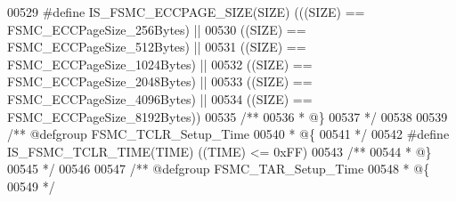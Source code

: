 \begin{DoxyCode}
00529 \textcolor{preprocessor}{#}\textcolor{preprocessor}{define} \textcolor{preprocessor}{IS\_FSMC\_ECCPAGE\_SIZE}\textcolor{preprocessor}{(}\textcolor{preprocessor}{SIZE}\textcolor{preprocessor}{)} \textcolor{preprocessor}{(}\textcolor{preprocessor}{(}\textcolor{preprocessor}{(}\textcolor{preprocessor}{SIZE}\textcolor{preprocessor}{)} \textcolor{preprocessor}{==} FSMC_ECCPageSize_256Bytes\textcolor{preprocessor}{)} \textcolor{preprocessor}{||}
00530                                     \textcolor{preprocessor}{(}\textcolor{preprocessor}{(}\textcolor{preprocessor}{SIZE}\textcolor{preprocessor}{)} \textcolor{preprocessor}{==} FSMC_ECCPageSize_512Bytes\textcolor{preprocessor}{)} \textcolor{preprocessor}{||}
00531                                     \textcolor{preprocessor}{(}\textcolor{preprocessor}{(}\textcolor{preprocessor}{SIZE}\textcolor{preprocessor}{)} \textcolor{preprocessor}{==} FSMC_ECCPageSize_1024Bytes\textcolor{preprocessor}{)} \textcolor{preprocessor}{||}
00532                                     \textcolor{preprocessor}{(}\textcolor{preprocessor}{(}\textcolor{preprocessor}{SIZE}\textcolor{preprocessor}{)} \textcolor{preprocessor}{==} FSMC_ECCPageSize_2048Bytes\textcolor{preprocessor}{)} \textcolor{preprocessor}{||}
00533                                     \textcolor{preprocessor}{(}\textcolor{preprocessor}{(}\textcolor{preprocessor}{SIZE}\textcolor{preprocessor}{)} \textcolor{preprocessor}{==} FSMC_ECCPageSize_4096Bytes\textcolor{preprocessor}{)} \textcolor{preprocessor}{||}
00534                                     \textcolor{preprocessor}{(}\textcolor{preprocessor}{(}\textcolor{preprocessor}{SIZE}\textcolor{preprocessor}{)} \textcolor{preprocessor}{==} FSMC_ECCPageSize_8192Bytes\textcolor{preprocessor}{)}\textcolor{preprocessor}{)}
00535 \textcolor{comment}{/**}
00536 \textcolor{comment}{  * @\}}
00537 \textcolor{comment}{  */}
00538 
00539 \textcolor{comment}{/** @defgroup FSMC\_TCLR\_Setup\_Time }
00540 \textcolor{comment}{  * @\{}
00541 \textcolor{comment}{  */}
00542 \textcolor{preprocessor}{#}\textcolor{preprocessor}{define} \textcolor{preprocessor}{IS\_FSMC\_TCLR\_TIME}\textcolor{preprocessor}{(}\textcolor{preprocessor}{TIME}\textcolor{preprocessor}{)} \textcolor{preprocessor}{(}\textcolor{preprocessor}{(}\textcolor{preprocessor}{TIME}\textcolor{preprocessor}{)} \textcolor{preprocessor}{<=} 0xFF\textcolor{preprocessor}{)}
00543 \textcolor{comment}{/**}
00544 \textcolor{comment}{  * @\}}
00545 \textcolor{comment}{  */}
00546 
00547 \textcolor{comment}{/** @defgroup FSMC\_TAR\_Setup\_Time }
00548 \textcolor{comment}{  * @\{}
00549 \textcolor{comment}{  */}

\end{DoxyCode}
